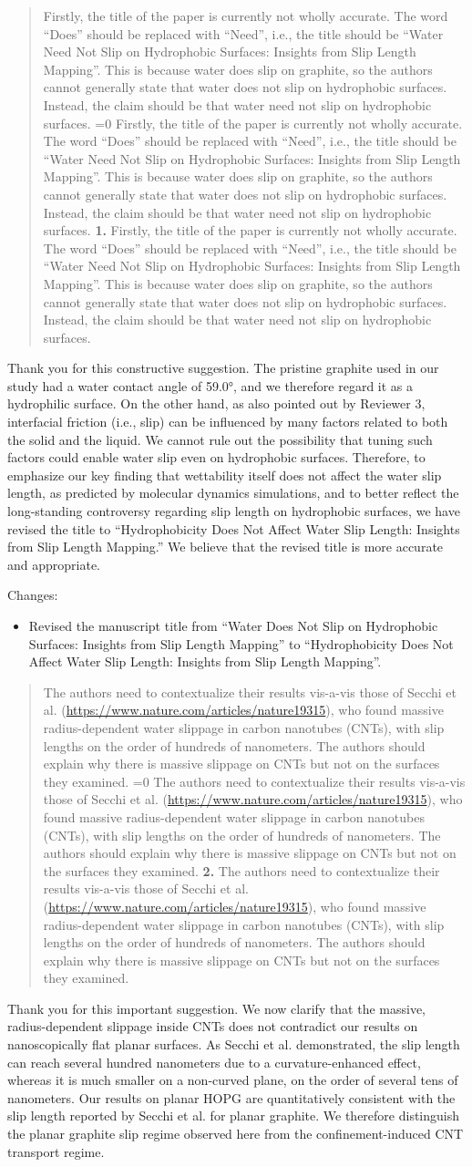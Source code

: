 ﻿\documentclass{article}
\newcommand{\Changes}{\par\vspace{0.75\baselineskip}\noindent Changes:}
\newcommand{\ReviewerComment}[2]{%
  \par\medskip\noindent
  \begin{quote}\small\color{black}
  \if\relax\detokenize{#1}\relax
    #2
  \else
    \ifnum#1=0
      #2
    \else
      \textbf{#1.} #2
    \fi
  \fi
  \end{quote}
  \color{blue}
}
\begin{document}
\ReviewerComment{1}{Firstly, the title of the paper is currently not wholly accurate. The word ``Does'' should be replaced with ``Need'', i.e., the title should be ``Water Need Not Slip on Hydrophobic Surfaces: Insights from Slip Length Mapping''. This is because water does slip on graphite, so the authors cannot generally state that water does not slip on hydrophobic surfaces. Instead, the claim should be that water need not slip on hydrophobic surfaces.}
Thank you for this constructive suggestion. The pristine graphite used in our study had a water contact angle of 59.0°, and we therefore regard it as a hydrophilic surface. On the other hand, as also pointed out by Reviewer 3, interfacial friction (i.e., slip) can be influenced by many factors related to both the solid and the liquid. We cannot rule out the possibility that tuning such factors could enable water slip even on hydrophobic surfaces. Therefore, to emphasize our key finding that wettability itself does not affect the water slip length, as predicted by molecular dynamics simulations, and to better reflect the long-standing controversy regarding slip length on hydrophobic surfaces, we have revised the title to “Hydrophobicity Does Not Affect Water Slip Length: Insights from Slip Length Mapping.” We believe that the revised title is more accurate and appropriate.

\Changes
\begin{itemize}
  \item Revised the manuscript title from ``Water Does Not Slip on Hydrophobic Surfaces: Insights from Slip Length Mapping'' to ``Hydrophobicity Does Not Affect Water Slip Length: Insights from Slip Length Mapping''.
\end{itemize}



\ReviewerComment{2}{The authors need to contextualize their results vis-a-vis those of Secchi et al. (\url{https://www.nature.com/articles/nature19315}), who found massive radius-dependent water slippage in carbon nanotubes (CNTs), with slip lengths on the order of hundreds of nanometers. The authors should explain why there is massive slippage on CNTs but not on the surfaces they examined.}
Thank you for this important suggestion. We now clarify that the massive, radius-dependent slippage inside CNTs does not contradict our results on nanoscopically flat planar surfaces. As Secchi et al. demonstrated, the slip length can reach several hundred nanometers due to a curvature-enhanced effect, whereas it is much smaller on a non-curved plane, on the order of several tens of nanometers. Our results on planar HOPG are quantitatively consistent with the slip length reported by Secchi et al. for planar graphite. We therefore distinguish the planar graphite slip regime observed here from the confinement-induced CNT transport regime.
\end{document}
